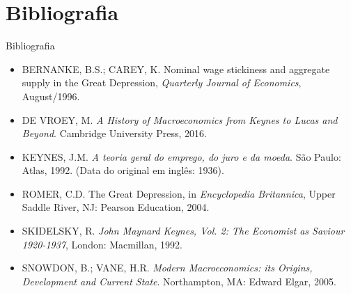 \documentclass[10pt]{beamer}
\begin{document}

\section{Bibliografia}
\begin{frame}{ Bibliografia}
    \begin{itemize}
        \item BERNANKE, B.S.; CAREY, K. Nominal wage stickiness and aggregate supply in the Great Depression, \emph{Quarterly Journal of Economics}, August/1996.\medskip
        \item DE VROEY, M. \emph{A History of Macroeconomics from Keynes to Lucas and Beyond}. Cambridge University Press, 2016.\medskip
        \item KEYNES, J.M. \emph{A teoria geral do emprego, do juro e da moeda}. São Paulo: Atlas, 1992. (Data do original em inglês: 1936).\medskip
        \item ROMER, C.D. The Great Depression, in \emph{Encyclopedia Britannica}, Upper Saddle River, NJ: Pearson Education, 2004.\medskip
        \item SKIDELSKY, R. \emph{John Maynard Keynes, Vol. 2: The Economist as Saviour 1920-1937}, London: Macmillan, 1992.\medskip
        \item SNOWDON, B.; VANE, H.R. \emph{Modern Macroeconomics: its Origins, Development and Current State}. Northampton, MA: Edward Elgar, 2005.
    \end{itemize}
\end{frame}
\end{document}
